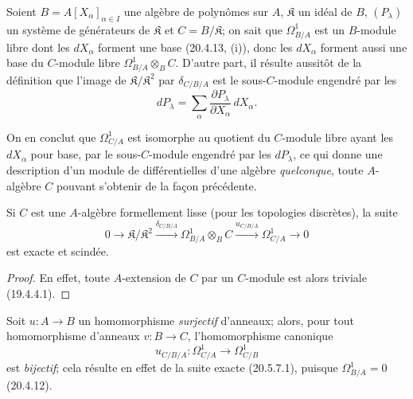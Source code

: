 \begin{example}[20.5.13]
\label{0.20.5.13-fr}
Soient $B=A[X_\alpha]_{\alpha\in I}$ une algèbre de polynômes sur $A$,
$\mathfrak{K}$ un idéal de $B$, $(P_\lambda)$ un système de générateurs
de $\mathfrak{K}$ et $C=B/\mathfrak{K}$; on sait que
$\Omega^1_{B/A}$ est un $B$-module libre dont les $dX_\alpha$ forment une
base (20.4.13, (i)), donc les $dX_\alpha$ forment aussi une base du
$C$-module libre $\Omega^1_{B/A}\otimes_B C$. D'autre part, il résulte
aussitôt de la définition que l'image de
$\mathfrak{K}/\mathfrak{K}^2$ par $\delta_{C/B/A}$ est le sous-$C$-module
engendré par les
\[
  dP_\lambda=\sum_\alpha
  \frac{\partial P_\lambda}{\partial X_\alpha}\,dX_\alpha.
\]

On en conclut que $\Omega^1_{C/A}$ est isomorphe au quotient du
$C$-module libre ayant les $dX_\alpha$ pour base, par le sous-$C$-module
engendré par les $dP_\lambda$, ce qui donne une description d'un module
de différentielles d'une algèbre \emph{quelconque}, toute $A$-algèbre
$C$ pouvant s'obtenir de la façon précédente.
\end{example}

\begin{corollary}[20.5.14]
\label{0.20.5.14-fr}
Si $C$ est une $A$-algèbre formellement lisse (pour les topologies
discrètes), la suite
\begin{equation}
\tag{20.5.14.1}
\label{0.20.5.14.1-fr}
  0\longrightarrow\mathfrak{K}/\mathfrak{K}^2
  \xrightarrow{\delta_{C/B/A}}\Omega^1_{B/A}\otimes_B C
  \xrightarrow{u_{C/B/A}}\Omega^1_{C/A}\longrightarrow0
\end{equation}
est exacte et scindée.
\end{corollary}

\begin{proof}
En effet, toute $A$-extension de $C$ par un $C$-module est alors triviale
(19.4.4.1).
\end{proof}

\begin{remark}[20.5.15]
\label{0.20.5.15-fr}
Soit $u:A\to B$ un homomorphisme \emph{surjectif} d'anneaux; alors, pour
tout homomorphisme d'anneaux $v:B\to C$, l'homomorphisme canonique
\begin{equation}
\tag{20.5.15.1}
\label{0.20.5.15.1-fr}
  u_{C/B/A}:\Omega^1_{C/A}\longrightarrow\Omega^1_{C/B}
\end{equation}
est \emph{bijectif}; cela résulte en effet de la suite exacte (20.5.7.1),
puisque $\Omega^1_{B/A}=0$ (20.4.12).
\end{remark}

